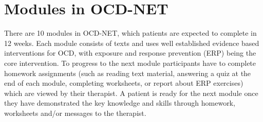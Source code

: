 \documentclass[]{book}
\theoremstyle{definition}
\theoremstyle{definition}
\theoremstyle{definition}
\theoremstyle{remark}
\begin{document}
\hypertarget{modules-in-ocd-net}{%
\section{Modules in OCD-NET}\label{modules-in-ocd-net}}

There are 10 modules in OCD-NET, which patients are expected to complete
in 12 weeks. Each module consists of texts and uses well established
evidence based interventions for OCD, with exposure and response
prevention (ERP) being the core intervention. To progress to the next
module participants have to complete homework assignments (such as
reading text material, answering a quiz at the end of each module,
completing worksheets, or report about ERP exercises) which are viewed
by their therapist. A patient is ready for the next module once they
have demonstrated the key knowledge and skills through homework,
worksheets and/or messages to the therapist.
\end{document}
